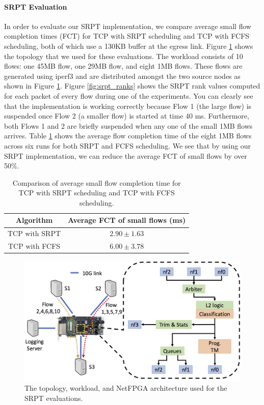 \paragraph{SRPT Evaluation}
In order to evaluate our SRPT implementation, we compare average small flow completion times (FCT) for TCP with SRPT scheduling and TCP with FCFS scheduling, both of which use a 130KB buffer at the egress link. Figure \ref {fig:srpt_setup} shows the topology that we used for these evaluations. The workload consists of 10 flows: one 45MB flow, one 29MB flow, and eight 1MB flows. These flows are generated using iperf3 and are distributed amongst the two source nodes as shown in Figure \ref{fig:srpt_setup}. Figure \ref{fig:srpt_ranks} shows the SRPT rank values computed for each packet of every flow during one of the experiments. You can clearly see that the implementation is working correctly because Flow 1 (the large flow) is suspended once Flow 2 (a smaller flow) is started at time 40 ms. Furthermore, both Flows 1 and 2 are briefly suspended when any one of the small 1MB flows arrives. Table \ref{tab:fct} shows the average flow completion time of the eight 1MB flows across six runs for both SRPT and FCFS scheduling. We see that by using our SRPT implementation, we can reduce the average FCT of small flows by over 50\%.

\begin{table}[tbp]
\centering
\caption{Comparison of average small flow completion time for TCP with SRPT scheduling and TCP with FCFS scheduling.}
\label{tab:fct}
\begin{tabular}{c|c}
\textbf{Algorithm} & \textbf{Average FCT of small flows (ms)} \\ \hline
TCP with SRPT      & $2.90 \pm 1.63$                          \\ \hline
TCP with FCFS      & $6.00 \pm 3.78$                         
\end{tabular}
\end{table}

\begin{figure}[!ht]
\includegraphics[width=1\linewidth]{figures/design/SRPT-setup}
\caption{The topology, workload, and NetFPGA architecture used for the SRPT evaluations.}
\label{fig:srpt_setup}
\end{figure}

